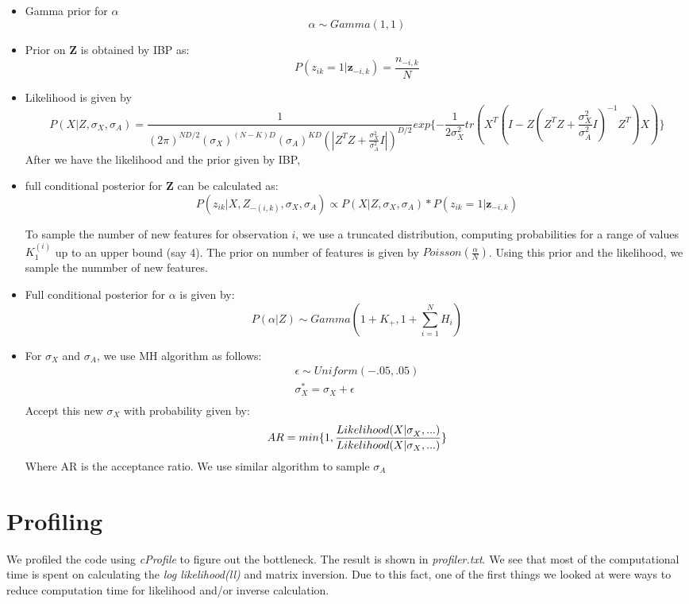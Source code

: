 \documentclass{article}
\begin{document}
\begin{itemize}
\item{Gamma prior for $\alpha$
$$
\alpha \sim Gamma(1,1)
$$}
\item{Prior on \textbf{Z} is obtained by IBP as:
$$
P(z_{ik}=1|\textbf{z}_{-i,k}) = \frac{n_{-i,k}}{N}
$$}

\item{Likelihood is given by
\begin{equation}
P(X|Z,\sigma_X, \sigma_A) = \frac{1}{(2 \pi)^{ND/2} (\sigma_X)^{(N-K)D}(\sigma_A)^{KD}(|Z^TZ+\frac{\sigma_X^2}{\sigma_A^2}I|)^{D/2}}exp\{-\frac{1}{2\sigma_X^2}tr(X^T(I-Z(Z^TZ+\frac{\sigma_X^2}{\sigma_A^2}I)^{-1}Z^T)X)\}
\end{equation}
}
After we have the likelihood and the prior given by IBP,
\item{full conditional posterior for \textbf{Z} can be calculated as:
$$
P(z_{ik}|X,Z_{-(i,k)},\sigma_X,\sigma_A) \propto  P(X|Z,\sigma_X, \sigma_A) * P(z_{ik}=1|\textbf{z}_{-i,k}) 
$$
}

To sample the number of new features for observation $i$, we use a truncated distribution, computing probabilities for a range of values $K_1^{(i)}$ up to an upper bound (say 4). The prior on number of features is given by $Poisson(\frac{\alpha}{N})$.
Using this prior and the likelihood, we sample the nummber of new features.

\item{Full conditional posterior for $\alpha$ is given by:
$$
P(\alpha|Z) \sim Gamma(1+K_+,1+\sum_{i=1}^{N} H_i)
$$}

\item{For $\sigma_X$ and $\sigma_A$, we use MH algorithm as follows:
\begin{eqnarray}
\epsilon \sim Uniform(-.05,.05)\\
\sigma_X^{*} =  \sigma_X +\epsilon\\
\end{eqnarray}
Accept this new $\sigma_X$ with probability given by:
$$
AR = min\{1,\frac{Likelihood(X|\sigma_X^{\*},...)}{Likelihood(X|\sigma_X,...)}\}\\
$$
Where AR is the acceptance ratio. We use similar algorithm to sample $\sigma_A$}

\end{itemize}



\section{Profiling}
We profiled the code using \textit{cProfile} to figure out the bottleneck. The result is shown in \textit{profiler.txt}. We see that most of the computational time is spent on calculating the \textit{log likelihood(ll)}  and matrix inversion. Due to this fact, one of the first things we looked at were ways to reduce computation time for likelihood and/or inverse calculation.\\
\end{document}
